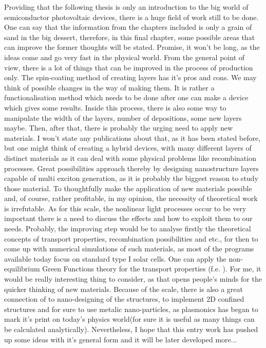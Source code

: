 Providing that the following thesis is only an introduction to the big world of semiconductor photovoltaic devices, there is a huge field of work still to be done. One can say that the information from the chapters included is only a grain of sand in the big dessert, therefore, in this final chapter, some possible areas that can improve the former thoughts will be stated. Promise, it won't be long, as the ideas come and go very fast in the physical world. From the general point of view, there is a lot of things that can be improved in the process of production only. The spin-coating method of creating layers has it's pros and cons. We may think of possible changes in the way of making them. It is rather a functionalisation method which needs to be done after one can make a device which gives some results. Inside this process, there is also some way to manipulate the width of the layers, number of depositions, some new layers maybe. Then, after that, there is probably the urging need to apply new materials. I won't state any publications about that, as it has been stated before, but one might think of creating a hybrid devices, with many different layers of distinct materials as it can deal with some physical problems like recombination processes. Great possibilities approach thereby by designing nanostructure layers capable of multi exciton generation, as it is probably the biggest reason to study those material. To thoughtfully make the application of new materials possible and, of course, rather profitable, in my opinion, the necessity of theoretical work is irrefutable. As for this scale, the nonlinear light processes occur to be very important there is a need to discuss the effects and how to exploit them to our needs. Probably, the improving step would be to analyse firstly the theoretical concepts of transport properties, recombination possibilities and etc., for then to come up with numerical simulations of such materials, as most of the programs available today focus on standard type I solar cells. One can apply the non-equilibrium Green Functions theory for the transport properties (f.e. \cite{green}). For me, it would be really interesting thing to consider, as that opens people's minds for the quicker thinking of new materials. Because of the scale, there is also a great connection of to nano-designing of the structures, to implement 2D confined structures and for sure to use metalic nano-particles, as plasmonics has began to mark it's print on today's physics world(for sure it is useful as many things can be calculated analytically). Nevertheless, I hope that this entry work has pushed up some ideas with it's general form and it will be later developed more...